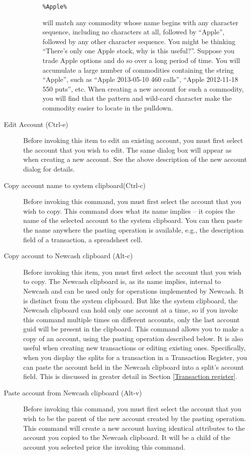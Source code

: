 \documentclass{report}
\begin{document}
\begin{description}
\begin{description}
\begin{verbatim}
%Apple%
\end{verbatim}
will match any commodity whose name begins with any character sequence, including no characters at all, followed by ``Apple'', followed by any other character sequence. You might be thinking ``There's only one Apple stock, why is this useful?''. Suppose you trade Apple options and do so over a long period of time. You will accumulate a large number of commodities containing the string ``Apple'', such as ``Apple 2013-05-10 460 calls'', ``Apple 2012-11-18 550 puts'', etc. When creating a new account for such a commodity, you will find that the pattern and wild-card character make the commodity easier to locate in the pulldown.
\end{description}
\item [Edit Account (Ctrl-e)] Before invoking this item to edit an existing account, you must first select the account that you wish to edit. The same dialog box will appear as when creating a new account.
See the above description of the new account dialog for details. 
\item [Copy account name to system clipboard(Ctrl-c)] Before invoking this command, you must first select the account that you wish to copy. This command does what its name implies -- it copies the name of the selected account to the system clipboard. You can then paste the name anywhere the pasting operation is available, e.g., the description field of a transaction, a spreadsheet cell. 
\item [Copy account to Newcash clipboard (Alt-c)] Before invoking this item, you must first select the account that you wish to copy. The Newcash clipboard is, as its name implies, internal to Newcash and can be used only for operations implemented by Newcash. It is distinct from the system clipboard. But like the system clipboard, the Newcash clipboard can hold only one account at a time, so if you invoke this command multiple times on different accounts, only the last account guid will be present in the clipboard. This command allows you to make a copy of an account, using the pasting operation described below. It is also useful when creating new transactions or editing existing ones. Specifically, when you display the splits for a transaction in a Transaction Register, you can paste the account held in the Newcash clipboard into a split's account field. This is discussed in greater detail in Section \ref{Transaction register}.
\item[Paste account from Newcash clipboard (Alt-v)] Before invoking this command, you must first select the account that you wish to be the parent of the new account created by the pasting operation. This command will create a new account having identical attributes to the account you copied to the Newcash clipboard. It will be a child of the account you selected prior the invoking this command.

\end{description}
\end{document}

